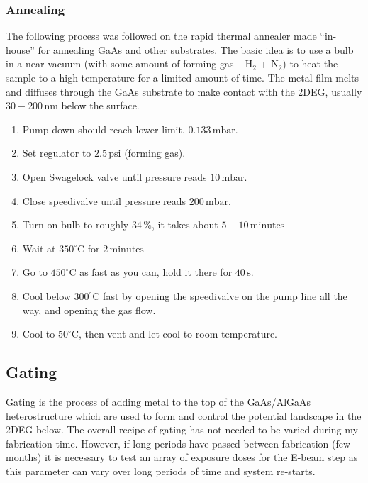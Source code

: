 \subsubsection{Annealing}
The following process was followed on the rapid thermal annealer made “in-house” for annealing GaAs and other substrates. The basic idea is to use a bulb in a near vacuum (with some amount of forming gas – $\mathrm{H_2}$ + $\mathrm{N_2}$) to heat the sample to a high temperature for a limited amount of time. The metal film melts and diffuses through the GaAs substrate to make contact with the 2DEG, usually $30-200\,\mathrm{nm}$ below the surface.

\begin{enumerate}
\item Pump down should reach lower limit, $0.133\,\mathrm{mbar}$.
\item Set regulator to $2.5\,\mathrm{psi}$ (forming gas).
\item Open Swagelock valve until pressure reads $10\,\mathrm{mbar}$.
\item Close speedivalve until pressure reads $200\,\mathrm{mbar}$.
\item Turn on bulb to roughly $34\,\%$, it takes about $5-10\,\mathrm{minutes}$
\item Wait at $350^\circ$C for $2\,\mathrm{minutes}$
\item Go to $450^\circ$C as fast as you can, hold it there for $40\,\mathrm{s}$.
\item Cool below $300^\circ$C fast by opening the speedivalve on the pump line all the way, and opening the gas flow.
\item Cool to $50^\circ$C, then vent and let cool to room temperature.
\end{enumerate}


\subsection{Gating}

Gating is the process of adding metal to the top of the GaAs/AlGaAs heterostructure which are used to form and control the potential landscape in the 2DEG below. The overall recipe of gating has not needed to be varied during my fabrication time. However, if long periods have passed between fabrication (few months) it is necessary to test an array of exposure doses for the E-beam step as this parameter can vary over long periods of time and system re-starts.





